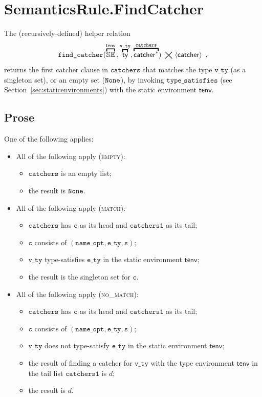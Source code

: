 \documentclass{book}
\newcommand\secref[1]{Section~\ref{sec:#1}}
\newcommand\overname[2]{\overbracket{#1}^{#2}}
\newcommand\tenv[0]{\textsf{tenv}}
\newcommand\aslrel[0]{\bigtimes}
\newcommand\aslsep[0]{\mathbf{,}}
\newcommand\typesatisfies[0]{\texttt{type\_satisfies}}
\newcommand\vc[0]{\texttt{c}}
\newcommand\vs[0]{\texttt{s}}
\newcommand\catchers[0]{\texttt{catchers}}
\newcommand\catchersone[0]{\texttt{catchers1}}
\newcommand\ety[0]{\texttt{e\_ty}}
\newcommand\vvty[0]{\texttt{v\_ty}}
\newcommand\nameopt[0]{\texttt{name\_opt}}
\begin{document}
\section{SemanticsRule.FindCatcher \label{sec:SemanticsRule.FindCatcher}}

\newcommand\findcatcher[0]{\texttt{find\_catcher}}
The (recursively-defined) helper relation
\[
  \findcatcher(\overname{\staticenvs}{\tenv} \aslsep \overname{\ty}{\vvty}, \overname{\catcher^*}{\catchers})
  \;\aslrel\; \langle \catcher \rangle \enspace,
\]
returns the first catcher clause in $\catchers$ that matches the type $\vvty$ (as a singleton set), or an empty set ($\texttt{None}$),
by invoking $\typesatisfies$ (see \secref{staticenvironments}) with the static environment $\tenv$.

\subsection{Prose}
One of the following applies:
\begin{itemize}
  \item All of the following apply (\textsc{empty}):
  \begin{itemize}
    \item $\catchers$ is an empty list;
    \item the result is $\texttt{None}$.
  \end{itemize}

  \item All of the following apply (\textsc{match}):
  \begin{itemize}
    \item $\catchers$ has $\vc$ as its head and $\catchersone$ as its tail;
    \item $\vc$ consists of $(\nameopt, \ety, \vs)$;
    \item $\vvty$ type-satisfies $\ety$ in the static environment $\tenv$;
    \item the result is the singleton set for $\vc$.
  \end{itemize}

  \item All of the following apply (\textsc{no\_match}):
  \begin{itemize}
    \item $\catchers$ has $\vc$ as its head and $\catchersone$ as its tail;
    \item $\vc$ consists of $(\nameopt, \ety, \vs)$;
    \item $\vvty$ does not type-satisfy $\ety$ in the static environment $\tenv$;
    \item the result of finding a catcher for $\vvty$ with the type environment $\tenv$ in the tail list $\catchersone$
    is $d$;
    \item the result is $d$.
  \end{itemize}
\end{itemize}
\end{document}
